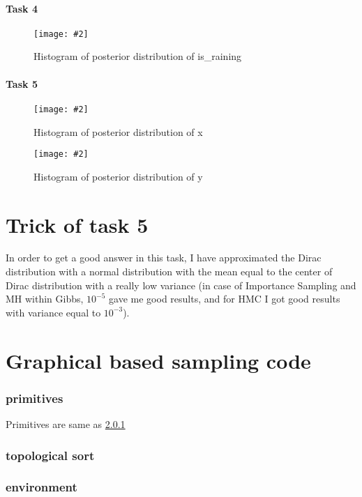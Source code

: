 \documentclass{article}
\newcommand{\centerfigcap}[3]{\begin{figure}[H]
\begin{center}\texttt{[image: \#2]} \caption{#3}\end{center}
\end{figure}}
\begin{document}
\paragraph{Task 4}
\centerfigcap{0.7}{../figures/Importance_Sampling_plt_hist_program_4_d_0}{Histogram of posterior distribution of is\_raining}
\paragraph{Task 5}

\begin{minipage}{.5\textwidth}
  \centering
\centerfigcap{1}{../figures/Importance_Sampling_plt_hist_program_5_d_0}{Histogram of posterior distribution of x}
\end{minipage}%
\begin{minipage}{.5\textwidth}
  \centering
\centerfigcap{1}{../figures/Importance_Sampling_plt_hist_program_5_d_1}{Histogram of posterior distribution of y}
\end{minipage}

\section{Trick of task 5}

In order to get a good answer in this task, I have approximated the Dirac distribution with a normal distribution with the mean equal to the center of Dirac distribution with a really low variance (in case of Importance Sampling and MH within Gibbs,  $10^{-5}$ gave me good results, and for HMC I got good results with variance equal to $10^{-3}$).
\pagebreak
\section{Graphical based sampling code}
\subsubsection{primitives}
\label{primitives}
Primitives are same as \ref{primitives}
\subsubsection{topological sort}

\subsubsection{environment}

\end{document}
